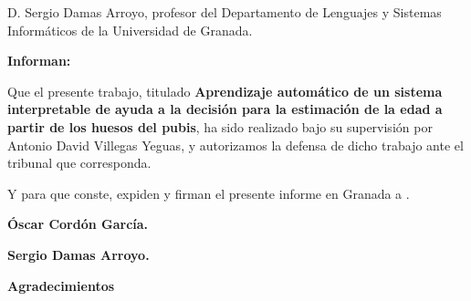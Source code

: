 D. Sergio Damas Arroyo, profesor del Departamento de Lenguajes y Sistemas Informáticos de la Universidad de Granada.

\vspace{1cm}

\textbf{Informan:}

\vspace{1cm}

Que el presente trabajo, titulado \textbf{Aprendizaje automático de un sistema interpretable de ayuda a la decisión para la estimación de la edad a partir de los huesos del pubis}, ha sido realizado bajo su supervisión por Antonio David Villegas Yeguas, y autorizamos la defensa de dicho trabajo ante el tribunal que corresponda.

\vspace{1cm}

Y para que conste, expiden y firman el presente informe en Granada a \thedate.

\vspace{5cm}

\textbf{Óscar Cordón García.}

\textbf{Sergio Damas Arroyo.}

\newpage

{\Large \textbf{Agradecimientos}}
